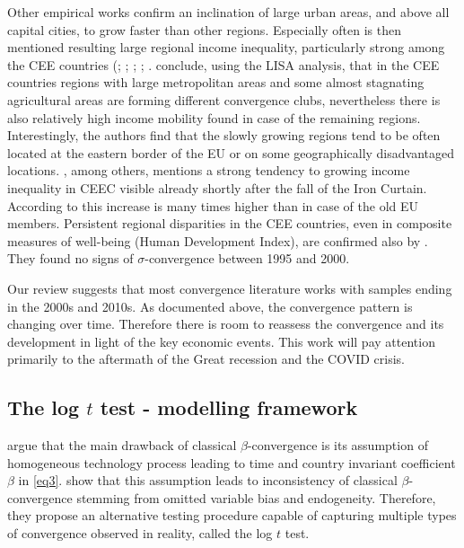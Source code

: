\documentclass[11pt]{article}
\begin{document}
Other empirical works confirm an inclination of large urban areas, and above all capital cities, to grow faster than other regions. Especially often is then mentioned resulting large regional income inequality, particularly strong among the CEE countries (\citet{cuaresma2014determinants}; \citet{sme2012regional}; \citet{szendi2013convergence}; \citet{chapman2012income}; \citet{monastiriotis2011regional}. \citet{sme2012regional} conclude, using the LISA analysis, that in the CEE countries regions with large metropolitan areas and some almost stagnating agricultural areas are forming different convergence clubs, nevertheless there is also relatively high income mobility found in case of the remaining regions. Interestingly, the authors find that the slowly growing regions tend to be often located at the eastern border of the EU or on some geographically disadvantaged locations. \citet{monastiriotis2011regional}, among others, mentions a strong tendency to growing income inequality in CEEC visible already shortly after the fall of the Iron Curtain. According to \citeauthor{monastiriotis2011regional} this increase is many times higher than in case of the old EU members. Persistent regional disparities in the CEE countries, even in composite measures of well-being (Human Development Index), are confirmed also by \citet{benedek2015paths}. They found no signs of $\sigma$-convergence between 1995 and 2000. 

Our review suggests that most convergence literature works with samples ending in the 2000s and 2010s. As documented above, the convergence pattern is changing over time. Therefore there is room to reassess the convergence and its development in light of the key economic events. This work will pay attention primarily to the aftermath of the Great recession and the COVID crisis.


\subsection{The log $t$ test - modelling framework}
\citet{phillips2007transition} argue that the main drawback of classical $\beta$-convergence is its assumption of homogeneous technology process leading to time and country invariant coefficient $\beta$ in \eqref{eq3}. \citet{phillips2007transition} show that this assumption leads to inconsistency of classical $\beta$-convergence stemming from omitted variable bias and endogeneity. Therefore, they propose an alternative testing procedure capable of capturing multiple types of convergence observed in reality, called the log $t$ test.
\end{document}
